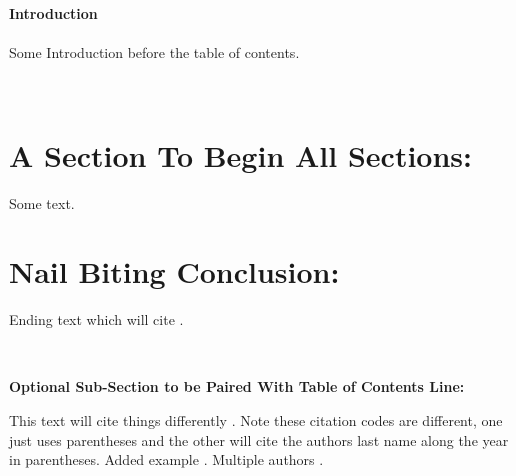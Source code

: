 \documentclass[12pt]{article}
\begin{document}
\begin{flushleft} 
\setlength{\parindent}{1cm} %


\thispagestyle{empty}     
\noindent \textbf{Introduction}\\ 
\hfill \\
Some Introduction before the table of contents. 

\hfill \\

\tableofcontents

\thispagestyle{empty}



\clearpage
\setcounter{page}{1}

\section{A Section To Begin All Sections:}

Some text.

\section{Nail Biting Conclusion:}

Ending text which will cite \citep{cary1967influence}.

\hfill \\

\noindent \textbf{Optional Sub-Section to be Paired With Table of Contents Line:}

This text will cite things differently \cite{cary1967influence}. Note these citation codes are different, one just uses parentheses and the other will cite the authors last name along the year in parentheses. Added example \citep{waltz2001man}. Multiple authors \citep{hibbing2013predisposed}.







\end{flushleft}
\end{document}
